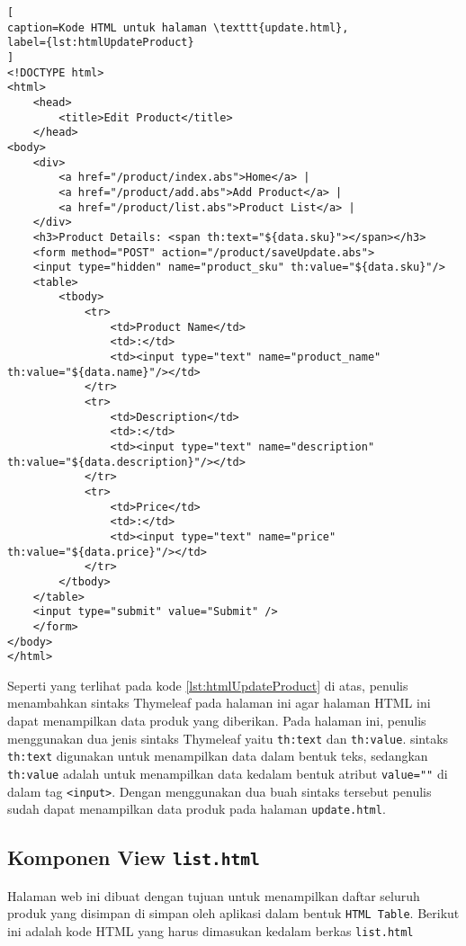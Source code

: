 \begin{lstlisting}[
caption=Kode HTML untuk halaman \texttt{update.html},
label={lst:htmlUpdateProduct}
]
<!DOCTYPE html>
<html>
	<head>
		<title>Edit Product</title>
	</head>
<body>
	<div>
		<a href="/product/index.abs">Home</a> |
		<a href="/product/add.abs">Add Product</a> |
		<a href="/product/list.abs">Product List</a> |
	</div>
	<h3>Product Details: <span th:text="${data.sku}"></span></h3>
	<form method="POST" action="/product/saveUpdate.abs">
	<input type="hidden" name="product_sku" th:value="${data.sku}"/>
	<table>
		<tbody>
			<tr>
				<td>Product Name</td>
				<td>:</td>
				<td><input type="text" name="product_name" th:value="${data.name}"/></td>
			</tr>
			<tr>
				<td>Description</td>
				<td>:</td>
				<td><input type="text" name="description" th:value="${data.description}"/></td>
			</tr>
			<tr>
				<td>Price</td>
				<td>:</td>
				<td><input type="text" name="price" th:value="${data.price}"/></td>
			</tr>
		</tbody>
	</table>
	<input type="submit" value="Submit" />
	</form>
</body>
</html>
\end{lstlisting}

Seperti yang terlihat pada kode \ref{lst:htmlUpdateProduct} di atas, penulis menambahkan sintaks Thymeleaf pada halaman ini agar halaman HTML ini dapat menampilkan data produk yang diberikan. Pada halaman ini, penulis menggunakan dua jenis sintaks Thymeleaf yaitu \texttt{th:text} dan \texttt{th:value}. sintaks \texttt{th:text} digunakan untuk menampilkan data dalam bentuk teks, sedangkan \texttt{th:value} adalah untuk menampilkan data kedalam bentuk atribut \texttt{value=""} di dalam tag \texttt{<input>}. Dengan menggunakan dua buah sintaks tersebut penulis sudah dapat menampilkan data produk pada halaman \texttt{update.html}.

\subsection{Komponen View \texttt{list.html}}

Halaman web ini dibuat dengan tujuan untuk menampilkan daftar seluruh produk yang disimpan di simpan oleh aplikasi dalam bentuk \texttt{HTML Table}. Berikut ini adalah kode HTML yang harus dimasukan kedalam berkas \texttt{list.html}

